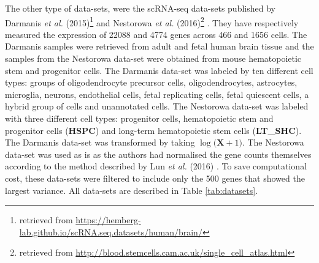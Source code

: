 The other type of data-sets, were the scRNA-seq data-sets published by Darmanis \textit{et al.} (2015)\footnote{retrieved from \url{https://hemberg-lab.github.io/scRNA.seq.datasets/human/brain/}} \cite{darmanis2015survey} and Nestorowa \textit{et al.} (2016)\footnote{retrieved from \url{http://blood.stemcells.cam.ac.uk/single_cell_atlas.html}} \cite{nestorowa2016single}. They have respectively measured the expression of 22088 and 4774 genes across 466 and 1656 cells. The Darmanis samples were retrieved from adult and fetal human brain tissue and the samples from the Nestorowa data-set were obtained from mouse hematopoietic stem and progenitor cells. The Darmanis data-set was labeled by ten different cell types: groups of oligodendrocyte precursor cells, oligodendrocytes, astrocytes, microglia, neurons, endothelial cells, fetal replicating cells, fetal quiescent cells, a hybrid group of cells and unannotated cells. The Nestorowa data-set was labeled with three different cell types: progenitor cells, hematopoietic stem and progenitor cells (\textbf{HSPC}) and long-term hematopoietic stem cells (\textbf{LT\_SHC}). The Darmanis data-set was transformed by taking $\log{(\bm{X}}+1)$. The Nestorowa data-set was used as is as the authors had normalised the gene counts themselves according to the method described by Lun \textit{et al.} (2016) \cite{lun2016pooling}. To save computational cost, these data-sets were filtered to include only the 500 genes that showed the largest variance.
All data-sets are described in Table \ref{tab:datasets}.

\small

